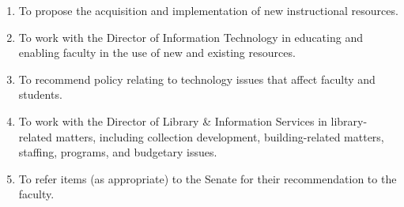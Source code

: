 \begin{enumerate}[label=\alph*)]
{\begin{enumerate}[label=\arabic*)]
								\item{To propose the acquisition and implementation of new instructional resources.}
								\item{To work with the Director of Information Technology in educating and enabling faculty in the use of new and existing resources.}
								\item{To recommend policy relating to technology issues that affect faculty and students.}
								\item{To work with the Director of Library \& Information Services in library-related matters, including collection development, building-related matters, staffing, programs, and budgetary issues.}
								\item{To refer items (as appropriate) to the Senate for their recommendation to the faculty.}
							\end{enumerate}
						}
					\end{enumerate}
